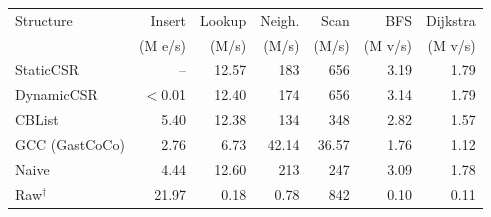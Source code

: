 \begin{tabular}{lrrrrrr}
\toprule
Structure & Insert & Lookup & Neigh. & Scan & BFS & Dijkstra \\
 & (M e/s) & (M/s) & (M/s) & (M/s) & (M v/s) & (M v/s) \\
\midrule
StaticCSR & -- & 12.57 & 183 & 656 & 3.19 & 1.79 \\
DynamicCSR & $<$0.01 & 12.40 & 174 & 656 & 3.14 & 1.79 \\
CBList & 5.40 & 12.38 & 134 & 348 & 2.82 & 1.57 \\
GCC (GastCoCo) & 2.76 & 6.73 & 42.14 & 36.57 & 1.76 & 1.12 \\
Naive & 4.44 & 12.60 & 213 & 247 & 3.09 & 1.78 \\
Raw$^\dagger$ & 21.97 & 0.18 & 0.78 & 842 & 0.10 & 0.11 \\
\bottomrule
\end{tabular}
